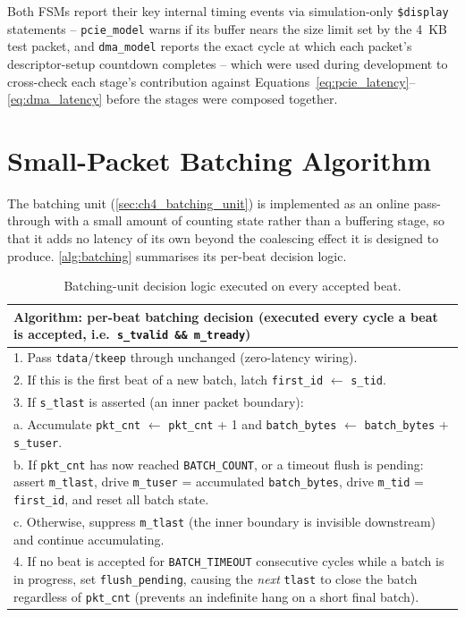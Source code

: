 Both FSMs report their key internal timing events via simulation-only \texttt{\$display} statements -- \texttt{pcie\_model} warns if its buffer nears the size limit set by the 4~KB test packet, and \texttt{dma\_model} reports the exact cycle at which each packet's descriptor-setup countdown completes -- which were used during development to cross-check each stage's contribution against Equations~\ref{eq:pcie_latency}--\ref{eq:dma_latency} before the stages were composed together.


\section{Small-Packet Batching Algorithm}
\label{sec:ch5_batching}

The batching unit (\autoref{sec:ch4_batching_unit}) is implemented as an online pass-through with a small amount of counting state rather than a buffering stage, so that it adds no latency of its own beyond the coalescing effect it is designed to produce. \autoref{alg:batching} summarises its per-beat decision logic.

\begin{table}[htbp]
\centering
\begin{tabular}{@{}p{}@{}}
\toprule
\textbf{Algorithm: per-beat batching decision} (executed every cycle a beat is accepted, i.e.\ \texttt{s\_tvalid \&\& m\_tready}) \\
\midrule
1. Pass \texttt{tdata}/\texttt{tkeep} through unchanged (zero-latency wiring). \\
2. If this is the first beat of a new batch, latch \texttt{first\_id} $\leftarrow$ \texttt{s\_tid}. \\
3. If \texttt{s\_tlast} is asserted (an inner packet boundary): \\
\quad a. Accumulate \texttt{pkt\_cnt} $\leftarrow$ \texttt{pkt\_cnt} + 1 and \texttt{batch\_bytes} $\leftarrow$ \texttt{batch\_bytes} + \texttt{s\_tuser}. \\
\quad b. If \texttt{pkt\_cnt} has now reached \texttt{BATCH\_COUNT}, or a timeout flush is pending: assert \texttt{m\_tlast}, drive \texttt{m\_tuser} = accumulated \texttt{batch\_bytes}, drive \texttt{m\_tid} = \texttt{first\_id}, and reset all batch state. \\
\quad c. Otherwise, suppress \texttt{m\_tlast} (the inner boundary is invisible downstream) and continue accumulating. \\
4. If no beat is accepted for \texttt{BATCH\_TIMEOUT} consecutive cycles while a batch is in progress, set \texttt{flush\_pending}, causing the \emph{next} \texttt{tlast} to close the batch regardless of \texttt{pkt\_cnt} (prevents an indefinite hang on a short final batch). \\
\bottomrule
\end{tabular}
\caption{Batching-unit decision logic executed on every accepted beat.}
\label{alg:batching}
\end{table}

